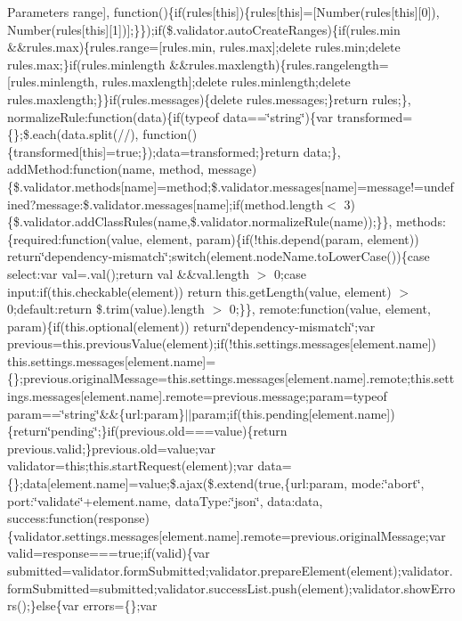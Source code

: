 \begin{DoxyParams}{Parameters}
\textquotesingle{}range\textquotesingle{}\mbox{]}, function()\{if(rules\mbox{[}this\mbox{]})\{rules\mbox{[}this\mbox{]}=\mbox{[}Number(rules\mbox{[}this\mbox{]}\mbox{[}0\mbox{]}), Number(rules\mbox{[}this\mbox{]}\mbox{[}1\mbox{]})\mbox{]};\}\});if(\$.validator.\+auto\+Create\+Ranges)\{if(rules.\+min \&\&rules.\+max)\{rules.\+range=\mbox{[}rules.\+min, rules.\+max\mbox{]};delete rules.\+min;delete rules.\+max;\}if(rules.\+minlength \&\&rules.\+maxlength)\{rules.\+rangelength=\mbox{[}rules.\+minlength, rules.\+maxlength\mbox{]};delete rules.\+minlength;delete rules.\+maxlength;\}\}if(rules.\+messages)\{delete rules.\+messages;\}return rules;\}, normalize\+Rule\+:function(data)\{if(typeof data==\char`\"{}string\char`\"{})\{var transformed=\{\};\$.each(data.\+split(//), function()\{transformed\mbox{[}this\mbox{]}=true;\});data=transformed;\}return data;\}, add\+Method\+:function(name, method, message)\{\$.validator.\+methods\mbox{[}name\mbox{]}=method;\$.validator.\+messages\mbox{[}name\mbox{]}=message!=undefined?message\+:\$.validator.\+messages\mbox{[}name\mbox{]};if(method.\+length$<$ 3)\{\$.validator.\+add\+Class\+Rules(name,\$.validator.\+normalize\+Rule(name));\}\}, methods\+:\{required\+:function(value, element, param)\{if(!this.depend(param, element)) return\char`\"{}dependency-\/mismatch\char`\"{};switch(element.\+node\+Name.\+to\+Lower\+Case())\{case \textquotesingle{}select\textquotesingle{}\+:var val=.val();return val \&\&val.\+length $>$ 0;case \textquotesingle{}input\textquotesingle{}\+:if(this.\+checkable(element)) return this.\+get\+Length(value, element) $>$ 0;default\+:return \$.trim(value).length $>$ 0;\}\}, remote\+:function(value, element, param)\{if(this.\+optional(element)) return\char`\"{}dependency-\/mismatch\char`\"{};var previous=this.\+previous\+Value(element);if(!this.settings.\+messages\mbox{[}element.\+name\mbox{]}) this.\+settings.\+messages\mbox{[}element.\+name\mbox{]}=\{\};previous.\+original\+Message=this.\+settings.\+messages\mbox{[}element.\+name\mbox{]}.remote;this.\+settings.\+messages\mbox{[}element.\+name\mbox{]}.remote=previous.\+message;param=typeof param==\char`\"{}string\char`\"{}\&\&\{url\+:param\}$\vert$$\vert$param;if(this.\+pending\mbox{[}element.\+name\mbox{]})\{return\char`\"{}pending\char`\"{};\}if(previous.\+old===value)\{return previous.\+valid;\}previous.\+old=value;var validator=this;this.\+start\+Request(element);var data=\{\};data\mbox{[}element.\+name\mbox{]}=value;\$.ajax(\$.extend(true,\{url\+:param, mode\+:\char`\"{}abort\char`\"{}, port\+:\char`\"{}validate\char`\"{}+element.name, data\+Type\+:\char`\"{}json\char`\"{}, data\+:data, success\+:function(response)\{validator.\+settings.\+messages\mbox{[}element.\+name\mbox{]}.remote=previous.\+original\+Message;var valid=response===true;if(valid)\{var submitted=validator.\+form\+Submitted;validator.\+prepare\+Element(element);validator.\+form\+Submitted=submitted;validator.\+success\+List.\+push(element);validator.\+show\+Errors();\}else\{var errors=\{\};var 
\end{DoxyParams}
